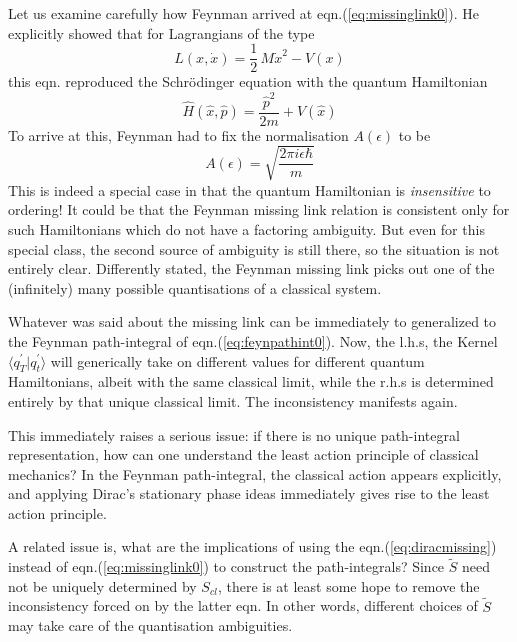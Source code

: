 \documentclass[12pt]{article}
\newcommand{\be}{\begin{equation}}
\newcommand{\ee}{\end{equation}}
\begin{document}
Let us
examine carefully how Feynman arrived at eqn.(\ref{eq:missinglink0}).
He explicitly showed that for Lagrangians of the type
\be
\label{eq:quadL}
L(x,{\dot x}) = \frac{1}{2}\,M{\dot x}^2 - V(x)
\ee
this eqn. reproduced the Schr\"odinger equation with the quantum Hamiltonian 
\be
\label{eq:quadH}
{\hat H({\hat x},{\hat p})} = \frac{{\hat p}^2}{2m} + V({\hat x})
\ee
To arrive at this, Feynman had to fix the normalisation $A(\epsilon)$ to be
\be
\label{eq:normfeyn}
A(\epsilon) = \sqrt{\frac{2\pi i \epsilon \hbar}{m}}
\ee
This is indeed a special case in that the quantum Hamiltonian is {\it insensitive} to ordering! It could be that the Feynman missing link
relation is consistent
only for such Hamiltonians which do not have a factoring ambiguity. But even for this special class, the second source of ambiguity is
still there, so the situation is not entirely clear. Differently stated, the Feynman missing link picks out one of the
(infinitely) many possible quantisations of a classical system. 

Whatever was said about the missing link can be immediately to generalized to the Feynman path-integral of eqn.(\ref{eq:feynpathint0}).
Now, the l.h.s, the Kernel $\langle q_T^\prime|q_t^\prime\rangle$ will generically take on different values for different quantum Hamiltonians,
albeit with the same classical limit, while the r.h.s is determined entirely by that unique classical limit. The inconsistency manifests
again.

This immediately raises a serious issue: if there is no unique path-integral representation, how can one understand the least action principle
of classical mechanics? In the Feynman path-integral, the classical action appears explicitly, and applying Dirac's stationary phase ideas
immediately gives rise to the least action principle.

A related issue is, what are the implications of using the eqn.(\ref{eq:diracmissing}) instead of eqn.(\ref{eq:missinglink0}) to
construct the path-integrals? Since ${\tilde S}$ need not be uniquely determined by $S_{cl}$, there is at least some hope to remove
the inconsistency forced on by the latter eqn. In other words, different choices of ${\tilde S}$ may take care of the quantisation ambiguities.
\end{document}
